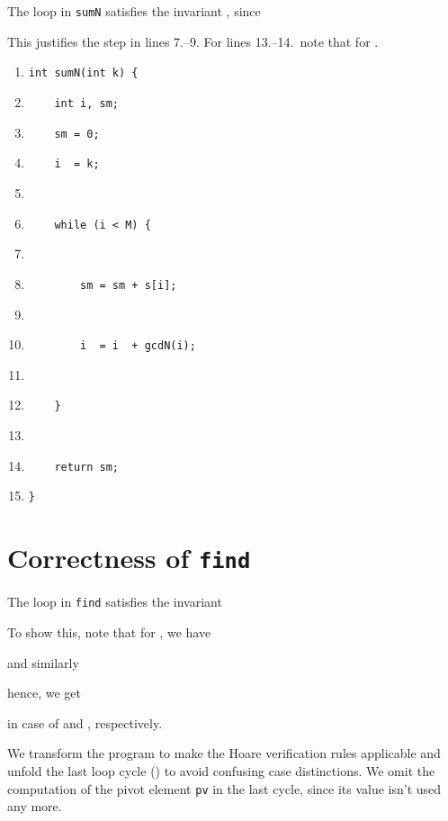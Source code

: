 \documentclass{elsartNoFoot}
\newcommand{\1}{\color{red}}
\newcommand{\2}{\color{green}}
\newcommand{\+}[3]{{\renewcommand{\i}{{#1}}{#3},\ldots,\renewcommand{\i}{{#2}}{#3}}}
\begin{document}
The loop in {\tt sumN} satisfies the invariant
,
since



This justifies the step in lines 7.--9.
For lines 13.--14.\ note that  for .

\begin{enumerate}
\setlength{\itemsep}{-0.0cm}
\renewcommand{\labelenumi}{\arabic{enumi}.}
 \item{\1\verb|int sumN(int k) {				|
}\item{\1\verb|    int i, sm;					|
}\item{\1\verb|    sm = 0;					|
}\item{\1\verb|    i  = k;					|
}\item{\2\verb|    |
}\item{\1\verb|    while (i < M) {				|
}\item{\2\verb|        |
}\item{\1\verb|        sm = sm + s[i];				|
}\item{\2\verb|        |
}\item{\1\verb|        i  = i  + gcdN(i);			|
}\item{\2\verb|        |
}\item{\1\verb|    }						|
}\item{\2\verb|    |
}\item{\1\verb|    return sm;					|
}\item{\1\verb|}						|
}
\end{enumerate}







\section{Correctness of {\tt find}}
\label{Correctness of find}

The loop in {\tt find} satisfies the invariant



To show this, note that for , we have



and similarly



hence, we get



in case of  and ,
respectively.

We transform the program to make the Hoare verification rules
applicable and unfold the last loop cycle () to avoid
confusing case distinctions.
We omit the computation of the pivot element
{\tt pv} in the last cycle, since its value
isn't used any more.
\end{document}
